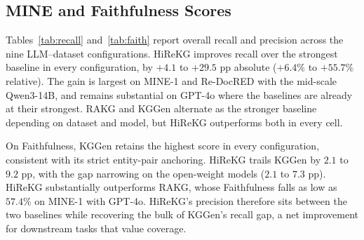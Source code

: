 \documentclass[11pt]{article}
\begin{document}
\subsection{MINE and Faithfulness Scores}
\label{sec:main-results}
Tables~\ref{tab:recall} and~\ref{tab:faith} report overall recall and precision across the nine LLM--dataset configurations. HiReKG improves recall over the strongest baseline in every configuration, by $+4.1$ to $+29.5$ pp absolute ($+6.4\%$ to $+55.7\%$ relative). The gain is largest on MINE-1 and Re-DocRED with the mid-scale Qwen3-14B, and remains substantial on GPT-4o where the baselines are already at their strongest. RAKG and KGGen alternate as the stronger baseline depending on dataset and model, but HiReKG outperforms both in every cell.

On Faithfulness, KGGen retains the highest score in every configuration, consistent with its strict entity-pair anchoring. HiReKG trails KGGen by $2.1$ to $9.2$ pp, with the gap narrowing on the open-weight models ($2.1$ to $7.3$ pp). HiReKG substantially outperforms RAKG, whose Faithfulness falls as low as $57.4\%$ on MINE-1 with GPT-4o. HiReKG's precision therefore sits between the two baselines while recovering the bulk of KGGen's recall gap, a net improvement for downstream tasks that value coverage.



\end{document}
